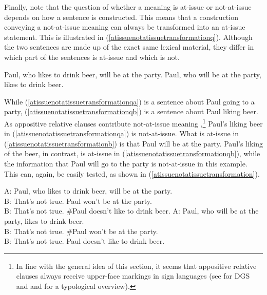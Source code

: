Finally, note that the question of whether a meaning is at-issue or not-at-issue depends on how a sentence is constructed. This means that a construction conveying a not-at-issue meaning can always be transformed into an at-issue statement. This is illustrated in (\ref{atissuenotatissuetransformationq}). Although the two sentences are made up of the exact same lexical material, they differ in which part of the sentences is at-issue and which is not. 

\begin{exe}
\ex\label{atissuenotatissuetransformationq}\begin{xlist}
\ex Paul, who likes to drink beer, will be at the party. \label{atissuenotatissuetransformationqa}
\ex Paul, who will be at the party, likes to drink beer. \label{atissuenotatissuetransformationqb}
\end{xlist}
\end{exe}

\noindent While (\ref{atissuenotatissuetransformationqa}) is a sentence about Paul going to a party, (\ref{atissuenotatissuetransformationqb}) is a sentence about Paul liking beer. As appositive relative clauses contribute not-at-issue meaning \citet{potts2005logic},\footnote{ In line with the general idea of this section, it seems that appositive relative clauses always receive upper-face markings in sign languages (see \citealt{pfau2005relative} for DGS and \citealt{branchinidonati2007} and \citealt{wilbur2017internally} for a typological overview).} Paul's liking beer in (\ref{atissuenotatissuetransformationqa}) is not-at-issue. What is at-issue in (\ref{atissuenotatissuetransformationb}) is that Paul will be at the party. Paul's liking of the beer, in contrast, is at-issue in (\ref{atissuenotatissuetransformationqb}), while the information that Paul will go to the party is not-at-issue in this example. This can, again, be easily tested, as shown in (\ref{atissuenotatissuetransformation}).

\begin{exe}
\ex\label{atissuenotatissuetransformation}\begin{xlist}
\ex A: Paul, who likes to drink beer, will be at the party. \\
B: That's not true. \phantom{\#}Paul won't be at the party.\\
B: That's not true. {\#}Paul doesn't like to drink beer. \label{atissuenotatissuetransformationa}
\ex A: Paul, who will be at the party, likes to drink beer. \\
B: That's not true. {\#}Paul won't be at the party.\\
B: That's not true. \phantom{\#}Paul doesn't like to drink beer. \label{atissuenotatissuetransformationb}
\end{xlist}
\end{exe}

